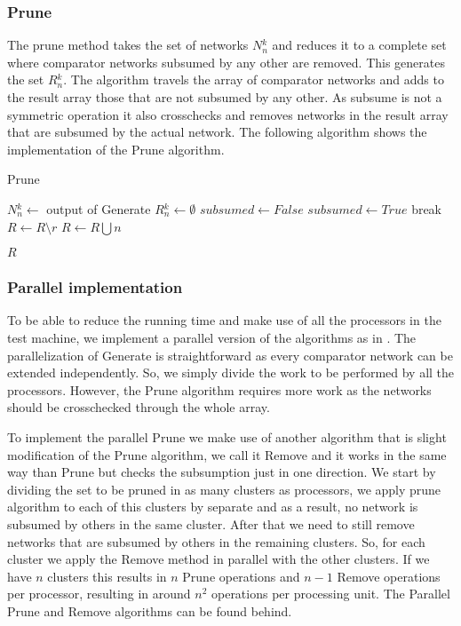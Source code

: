 \documentclass[../main.tex]{subfiles}
\begin{document}
	\subsubsection{Prune}
	The prune method takes the set of networks $N{_n^{k}}$ and reduces it to a complete set where comparator networks subsumed by any other are removed. This generates the set $R{_n^k}$. The algorithm travels the array of comparator networks and adds to the result array those that are not subsumed by any other. As subsume is not a symmetric operation it also crosschecks and removes networks in the result array that are subsumed by the actual network. The following algorithm shows the implementation of the Prune algorithm. 
	\begin{algorithm}[H]
		\caption{Prune} 
		\begin{algorithmic}
			\State $N{_n^k} \leftarrow$ output of Generate
			\State $R{_n^k} \leftarrow \emptyset$
			\State $subsumed \leftarrow False$
						\State $subsumed \leftarrow True$
						\State break
					\EndIf
						\State $R \leftarrow R \setminus r$
					\EndIf
				\EndFor
					\State $R \leftarrow R \bigcup n$
				\EndIf
			\EndFor
			
		\Return $R$
		\end{algorithmic}
	\end{algorithm}
	
	\subsubsection{Parallel implementation}
	To be able to reduce the running time and make use of all the processors in the test machine, we implement a parallel version of the algorithms as in \cite{sortingnineinputs}. The parallelization of Generate is straightforward as every comparator network can be extended independently. So, we simply divide the work to be performed by all the processors.
	However, the Prune algorithm requires more work as the networks should be crosschecked through the whole array.
	
	To implement the parallel Prune we make use of another algorithm that is slight modification of the Prune algorithm, we call it Remove and it works in the same way than Prune but checks the subsumption just in one direction. We start by dividing the set to be pruned in as many clusters as processors, we apply prune algorithm to each of this clusters by separate and as a result, no network is subsumed by others in the same cluster. After that we need to still remove networks that are subsumed by others in the remaining clusters. So, for each cluster we apply the Remove method in parallel with the other clusters. If we have $n$ clusters this results in $n$ Prune operations and $n - 1$ Remove operations per processor, resulting in around $n^2$ operations per processing unit. The Parallel Prune and Remove algorithms can be found behind.
	
\end{document}
